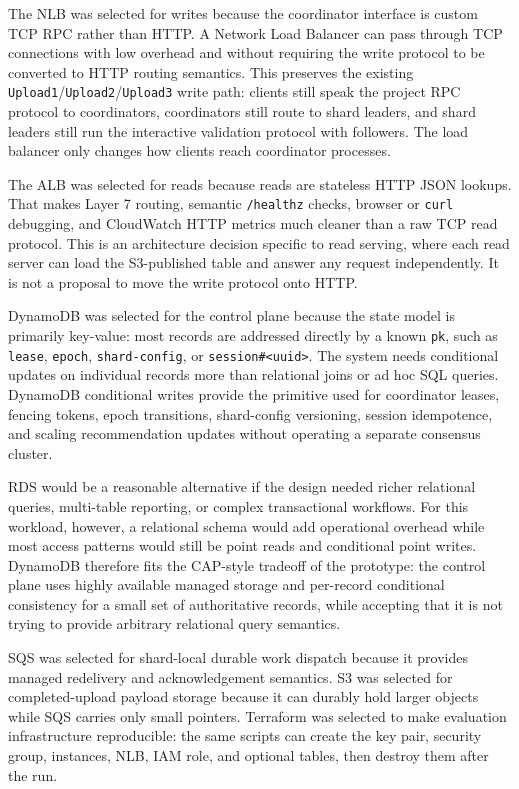 \documentclass[conference]{IEEEtran}
\begin{document}
The NLB was selected for writes because the coordinator interface is custom TCP RPC rather than HTTP. A Network Load Balancer can pass through TCP connections with low overhead and without requiring the write protocol to be converted to HTTP routing semantics. This preserves the existing \texttt{Upload1}/\texttt{Upload2}/\texttt{Upload3} write path: clients still speak the project RPC protocol to coordinators, coordinators still route to shard leaders, and shard leaders still run the interactive validation protocol with followers. The load balancer only changes how clients reach coordinator processes.

The ALB was selected for reads because reads are stateless HTTP JSON lookups. That makes Layer 7 routing, semantic \texttt{/healthz} checks, browser or \texttt{curl} debugging, and CloudWatch HTTP metrics much cleaner than a raw TCP read protocol. This is an architecture decision specific to read serving, where each read server can load the S3-published table and answer any request independently. It is not a proposal to move the write protocol onto HTTP.

DynamoDB was selected for the control plane because the state model is primarily key-value: most records are addressed directly by a known \texttt{pk}, such as \texttt{lease}, \texttt{epoch}, \texttt{shard-config}, or \texttt{session\#<uuid>}. The system needs conditional updates on individual records more than relational joins or ad hoc SQL queries. DynamoDB conditional writes provide the primitive used for coordinator leases, fencing tokens, epoch transitions, shard-config versioning, session idempotence, and scaling recommendation updates without operating a separate consensus cluster.

RDS would be a reasonable alternative if the design needed richer relational queries, multi-table reporting, or complex transactional workflows. For this workload, however, a relational schema would add operational overhead while most access patterns would still be point reads and conditional point writes. DynamoDB therefore fits the CAP-style tradeoff of the prototype: the control plane uses highly available managed storage and per-record conditional consistency for a small set of authoritative records, while accepting that it is not trying to provide arbitrary relational query semantics.

SQS was selected for shard-local durable work dispatch because it provides managed redelivery and acknowledgement semantics. S3 was selected for completed-upload payload storage because it can durably hold larger objects while SQS carries only small pointers. Terraform was selected to make evaluation infrastructure reproducible: the same scripts can create the key pair, security group, instances, NLB, IAM role, and optional tables, then destroy them after the run.
\end{document}
